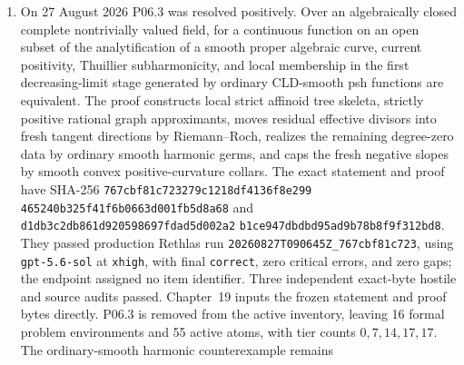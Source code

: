 \begin{enumerate}
  recovers every coordinate differential from the one full-ambient Hessian
  tensor, and specializes back by value-group-rational constant sections.
  Applied to split Raynaud uniformization, the normalized cubical metric of
  an ample line bundle is ordinary delta exactly when the residual Raynaud
  extension is isotrivial; constant rescaling shows that every cubical
  metric on the line bundle has the same status.  Hence the answer to the
  non-isotrivial mixed-reduction question is no.  The exact statement and
  proof passed production run
  \texttt{20260826T055627Z\_b68659fba1be}, item
  \texttt{pi\_75c74fac9a98efc3719b9773}, using
  \texttt{gpt-5.6-sol} at \texttt{xhigh}, with final
  \texttt{correct}, one checked item, zero critical errors, and zero gaps.
  They are included byte-for-byte in Chapter~19, and the formal problem
  environment has been removed from Chapter~72.  The inventory is therefore
  16 problem environments and 56 active atoms, with tier counts
  \(0,8,14,17,17\).  No novelty or priority claim is made.
\item On 27 August 2026 P06.3 was resolved positively.  Over an algebraically
  closed complete nontrivially valued field, for a continuous function on an
  open subset of the analytification of a smooth proper algebraic curve,
  current positivity, Thuillier subharmonicity, and local membership in the
  first decreasing-limit stage generated by ordinary CLD-smooth psh
  functions are equivalent.  The proof constructs local strict affinoid tree
  skeleta, strictly positive rational graph approximants, moves residual
  effective divisors into fresh tangent directions by Riemann--Roch, realizes
  the remaining degree-zero data by ordinary smooth harmonic germs, and caps
  the fresh negative slopes by smooth convex positive-curvature collars.
  The exact statement and proof have SHA-256
  \texttt{767cbf81c723279c1218df4136f8e299}
  \allowbreak\texttt{465240b325f41f6b0663d001fb5d8a68} and
  \texttt{d1db3c2db861d920598697fdad5d002a2}
  \allowbreak\texttt{b1ce947dbdbd95ad9b78b8f9f312bd8}.  They passed
  production Rethlas run
  \texttt{20260827T090645Z\_767cbf81c723}, using
  \texttt{gpt-5.6-sol} at \texttt{xhigh}, with final
  \texttt{correct}, zero critical errors, and zero gaps; the endpoint
  assigned no item identifier.  Three independent exact-byte hostile and
  source audits passed.  Chapter~19 inputs the frozen statement and proof
  bytes directly.  P06.3 is removed from the active inventory, leaving 16
  formal problem environments and 55 active atoms, with tier counts
  \(0,7,14,17,17\).  The ordinary-smooth harmonic counterexample remains

\end{enumerate}
